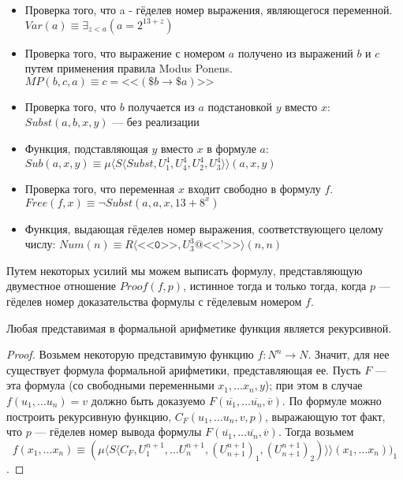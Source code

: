 \begin{itemize}
\item Проверка того, что a - гёделев номер выражения, являющегося переменной.
$Var(a) \equiv \exists_{z < a} (a = 2 ^ {13 + z})$

\item Проверка того, что выражение с номером $a$ получено из выражений $b$ и $c$ 
путем применения правила Modus Ponens.
$MP (b,c,a) \equiv c = \texttt{<<}( \$b \rightarrow \$a  )\texttt{>>}$

\item Проверка того, что $b$ получается из $a$ подстановкой $y$ вместо $x$:
$Subst (a,b,x,y)$ --- без реализации

\item Функция, подставляющая $y$ вместо $x$ в формуле $a$:\\
$Sub (a,x,y) \equiv \mu \langle{}S\langle{}Subst,U^4_1,U^4_4,U^4_2,U^4_3\rangle\rangle(a,x,y)$

\item Проверка того, что переменная $x$ входит свободно в формулу $f$.\\
$Free (f,x) \equiv \neg Subst(a,a,x,13 + 8^x)$

\item Функция, выдающая гёделев номер выражения, соответствующего целому числу:
$Num (n) \equiv R\langle{}\texttt{<<0>>},U^3_3 @ \texttt{<<'>>}\rangle (n,n)$

\end{itemize}

Путем некоторых усилий мы можем выписать формулу, представляющую
двуместное отношение $Proof(f,p)$, истинное тогда и только тогда, когда
$p$ --- гёделев номер доказательства формулы с гёделевым номером $f$.

\begin{theorem}
Любая представимая в формальной арифметике функция является рекурсивной.
\end{theorem}
\begin{proof}
Возьмем некоторую представимую функцию $f: N^n \rightarrow N$. Значит, для нее существует
формула формальной арифметики, представляющая ее. Пусть $F$ --- эта формула
(со свободными переменными $x_1, \dots x_n, y$); при этом в случае 
$f(u_1, \dots u_n) = v$ должно быть доказуемо $F(\overline{u_1}, \dots \overline{u_n}, \overline{v})$.
По формуле можно построить рекурсивную функцию, $C_F (u_1, \dots u_n, v, p)$, 
выражающую тот факт, что $p$ --- гёделев номер вывода формулы 
$F(\overline{u_1}, \dots \overline{u_n}, \overline{v})$. Тогда 
возьмем $$f (x_1, \dots x_n) \equiv (\mu \langle{}S\langle{}C_F,U^{n+1}_1,\dots U^{n+1}_n,(U^{n+1}_{n+1})_1, (U^{n+1}_{n+1})_2)\rangle\rangle (x_1, \dots x_n))_1$$.
\end{proof}
